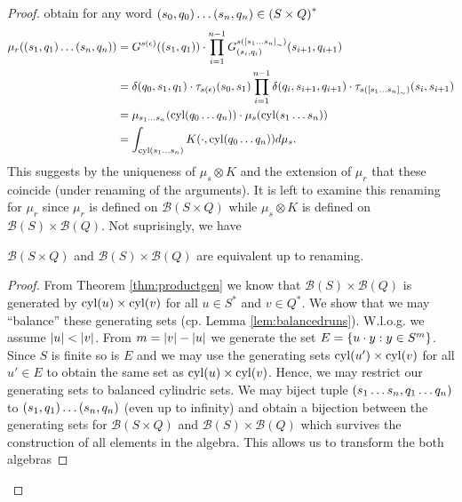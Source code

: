 \begin{proof}
  obtain for any word 
  $\left(s_{0}, q_{0}\right)\dots\left(s_{n}, q_{n}\right)\in\left(S\times Q\right)^{*}$
  \begin{align*}
    \mu_{r}(\left(s_{1}, q_{1}\right)\dots\left(s_{n}, q_{n}\right)) &= 
      G^{s(\epsilon)}(\left(s_{1}, q_{1}\right))\cdot 
      \prod\limits_{i = 1}^{n-1}
        G^{s(\left[s_{1}\dots s_{n}\right]_{\sim})}_{\left(s_{i}, q_{i}\right)}(
          s_{i+1}, q_{i+1})\\
    &= \delta(q_{0}, s_{1}, q_{1})\cdot\tau_{s(\epsilon)}(s_{0}, s_{1})
      \prod\limits_{i = 1}^{n-1}
        \delta(q_{i}, s_{i+1}, q_{i+1})\cdot
        \tau_{s(\left[s_{1}\dots s_{n}\right]_{\sim})}(s_{i}, s_{i+1})\\
    &= \mu_{s_{1}\dots s_{n}}(\operatorname{cyl}(q_{0}\dots q_{n}))\cdot
      \mu_{s}(\operatorname{cyl}(s_{1}\dots s_{n}))\\
    &= \int_{\operatorname{cyl}(s_{1}\dots s_{n})}K(\cdot, \operatorname{cyl}(q_{0}\dots q_{n}))d\mu_{s}.
  \end{align*}
  This suggests by the uniqueness of $\mu_{s}\otimes K$ and the extension of
  $\mu_{r}$ that these coincide (under renaming of the arguments). It is left
  to examine this renaming for $\mu_{r}$ since $\mu_{r}$ is defined on 
  $\mathcal{B}(S\times Q)$ while $\mu_{s}\otimes K$ is defined on 
  $\mathcal{B}(S)\times\mathcal{B}(Q)$. Not suprisingly, we have
  \begin{lemma}
    $\mathcal{B}(S\times Q)$ and $\mathcal{B}(S)\times\mathcal{B}(Q)$ are 
    equivalent up to renaming.
  \end{lemma}
  \begin{proof}
    From Theorem \ref{thm:productgen} we know that 
    $\mathcal{B}(S)\times\mathcal{B}(Q)$ is generated by $\operatorname{cyl}(u)\times\operatorname{cyl}(v)$ 
    for all $u\in S^{*}$ and $v\in Q^{*}$. We show that we may 
    \enquote{balance} these generating sets (cp. Lemma \ref{lem:balancedruns}). 
    W.l.o.g. we assume $\left\vert{u}\right\vert < \left\vert{v}\right\vert$. From $m = \left\vert{v}\right\vert - \left\vert{u}\right\vert$ we 
    generate the set $E = \left\{u\cdot y:y\in S^{m}\right\}$. Since $S$ is finite so is 
    $E$ and we may use the generating sets $\operatorname{cyl}(u')\times\operatorname{cyl}(v)$ for all 
    $u'\in E$ to obtain the same set as $\operatorname{cyl}(u)\times\operatorname{cyl}(v)$. Hence, we may 
    restrict our generating sets to balanced cylindric sets. We may biject 
    tuple $\left(s_{1}\dots s_{n}, q_{1}\dots q_{n}\right)$ to 
    $\left(s_{1}, q_{1}\right)\dots \left(s_{n}, q_{n}\right)$ (even up to infinity) and
    obtain a bijection between the generating sets for $\mathcal{B}(S\times Q)$
    and $\mathcal{B}(S)\times\mathcal{B}(Q)$ which survives the construction of
    all elements in the algebra. This allows us to transform the both algebras

\end{proof}
\end{proof}
